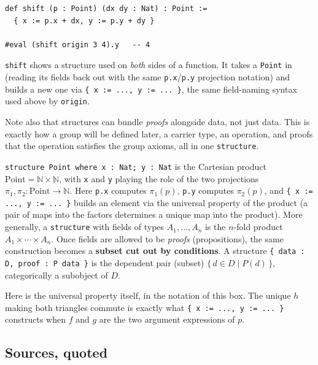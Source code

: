 \begin{lstlisting}
def shift (p : Point) (dx dy : Nat) : Point :=
  { x := p.x + dx, y := p.y + dy }

#eval (shift origin 3 4).y   -- 4
\end{lstlisting}

\texttt{shift} shows a structure used on \emph{both} sides of a function. It takes a \texttt{Point} in (reading its fields back out with the same \texttt{p.x}/\texttt{p.y} projection notation) and builds a new one via \texttt{\{ x := ..., y := ... \}}, the same field-naming syntax used above by \texttt{origin}.

Note also that structures can bundle \emph{proofs} alongside data, not just data. This is exactly how a group will be defined later, a carrier type, an operation, and proofs that the operation satisfies the group axioms, all in one \texttt{structure}.

\begin{mathreading}

\texttt{structure Point where x : Nat; y : Nat} is the Cartesian product \(\mathrm{Point} = \mathbb{N} \times \mathbb{N}\), with \texttt{x} and \texttt{y} playing the role of the two projections \(\pi_1, \pi_2 : \mathrm{Point} \to \mathbb{N}\). Here \texttt{p.x} computes \(\pi_1(p)\), \texttt{p.y} computes \(\pi_2(p)\), and \texttt{\{ x := ..., y := ... \}} builds an element via the universal property of the product (a pair of maps into the factors determines a unique map into the product). More generally, a \texttt{structure} with fields of types \(A_1, \ldots, A_n\) is the \(n\)-fold product \(A_1 \times \cdots \times A_n\). Once fields are allowed to be \emph{proofs} (propositions), the same construction becomes a \textbf{subset cut out by conditions}. A structure \texttt{\{ data : D, proof : P data \}} is the dependent pair (subset) \(\{\, d \in D \mid P(d) \,\}\), categorically a subobject of \(D\).

\end{mathreading}

Here is the universal property itself, in the notation of this box. The unique \(h\) making both triangles commute is exactly what \texttt{\{ x := ..., y := ... \}} constructs when \(f\) and \(g\) are the two argument expressions of \(p\).

\begin{center}

\end{center}

\subsection{Sources, quoted}\label{sec:02-functions-and-structures:01-structure-basics:2}

